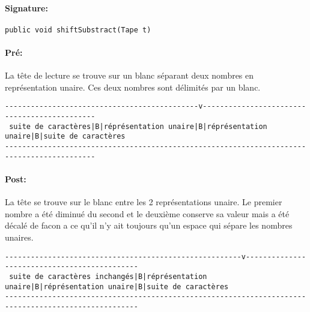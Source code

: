 \documentclass[a4paper,11pt]{article}
\begin{document}
\paragraph{Signature:} \texttt{public void shiftSubstract(Tape t)}
\paragraph{Pré:}
La tête de lecture se trouve sur un blanc séparant deux nombres en représentation unaire. Ces deux nombres sont délimités par un blanc.
\begin{small}
\begin{verbatim}
---------------------------------------------v---------------------------------------------
 suite de caractères|B|réprésentation unaire|B|réprésentation unaire|B|suite de caractères
-------------------------------------------------------------------------------------------
\end{verbatim}
\end{small}
\paragraph{Post:}
La tête se trouve sur le blanc entre les 2 représentations unaire. Le premier nombre a été diminué du second et le deuxième conserve sa valeur mais a été décalé de facon a ce qu'il n'y ait toujours qu'un espace qui sépare les nombres unaires.
\begin{footnotesize}
\begin{verbatim}
-------------------------------------------------------v---------------------------------------------
 suite de caractères inchangés|B|réprésentation unaire|B|réprésentation unaire|B|suite de caractères
-----------------------------------------------------------------------------------------------------
\end{verbatim}
\end{footnotesize}
\end{document}
